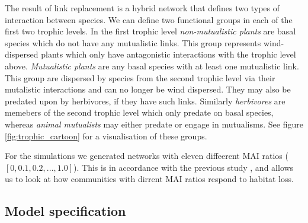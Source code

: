 The result of link replacement is a hybrid network that defines two types of interaction between species. We can define  two functional groups in each of the first two trophic levels. In the first trophic level \emph{non-mutualistic plants} are basal species which do not have any mutualistic links. This group represents wind-dispersed plants which only have antagonistic interactions with the trophic level above. \emph{Mutualistic plants} are any basal species with at least one mutualistic link. This group are dispersed by species from the second trophic level via their mutalistic interactions and can no longer be wind dispersed. They may also be predated upon by herbivores, if they have such links. Similarly \emph{herbivores} are memebers of the second trophic level which only predate on basal species, whereas \emph{animal mutualists} may either predate or engage in mutualisms. See figure \ref{fig:trophic_cartoon} for a visualisation of these groups. 

For the simulations we generated networks with eleven diffeerent MAI ratios ($[0,0.1,0.2,...,1.0]$). This is in accordance with the previous study \cite{lurgi2015effects}, and allows us to look at how communities with dirrent MAI ratios respond to habitat loss. 


\subsection{Model specification}
\label{sec:the_model}





